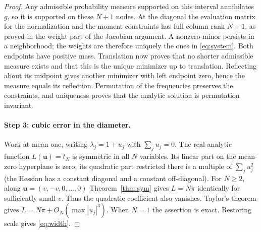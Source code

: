 \documentclass[11pt]{article}
\theoremstyle{remark}\newtheorem{remark}[theorem]{Remark}
\begin{document}
\begin{proof}
Any admissible probability measure supported on this interval annihilates $g$, so it is supported on these $N+1$ nodes. At the diagonal the evaluation matrix for the normalization and the moment constraints has full column rank $N+1$, as proved in the weight part of the Jacobian argument. A nonzero minor persists in a neighborhood; the weights are therefore uniquely the ones in \eqref{eq:system}. Both endpoints have positive mass. Translation now proves that no shorter admissible measure exists and that this is the unique minimizer up to translation. Reflecting about its midpoint gives another minimizer with left endpoint zero, hence the measure equals its reflection. Permutation of the frequencies preserves the constraints, and uniqueness proves that the analytic solution is permutation invariant.

\paragraph{Step 3: cubic error in the diameter.} Work at mean one, writing $\lambda_j=1+u_j$ with $\sum_j u_j=0$. The real analytic function $L(\boldsymbol u)=t_N$ is symmetric in all $N$ variables. Its linear part on the mean-zero hyperplane is zero; its quadratic part restricted there is a multiple of $\sum_j u_j^2$ (the Hessian has a constant diagonal and a constant off-diagonal). For $N\ge2$, along $\boldsymbol u=(v,-v,0,\dots,0)$ Theorem~\ref{thm:sym} gives $L=N\pi$ identically for sufficiently small $v$. Thus the quadratic coefficient also vanishes. Taylor's theorem gives $L=N\pi+O_N(\max|u_j|^3)$. When $N=1$ the assertion is exact. Restoring scale gives \eqref{eq:width}.\end{proof}
\end{document}
